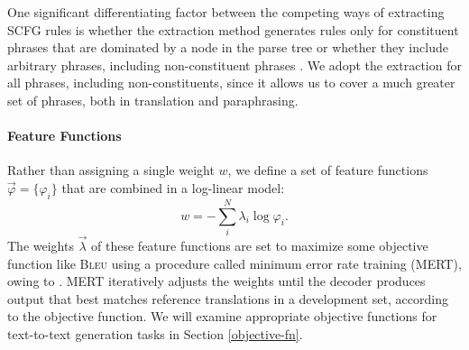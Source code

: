 \documentclass[11pt]{article}
\begin{document}
One significant differentiating factor between the competing ways of
extracting SCFG rules is whether the extraction method generates rules
only for constituent phrases that are dominated by a node in the parse
tree \cite{Galley2004,cohn-lapata:2008} or whether they include
arbitrary phrases, including non-constituent phrases
\cite{Zollmann2006,Callison-Burch2008}. We adopt the extraction for
all phrases, including non-constituents, since it allows us to cover a
much greater set of phrases, both in translation and paraphrasing.




\paragraph{Feature Functions}

Rather than assigning a single weight $w$, we define a set of feature
functions $\vec{\varphi} = \{\varphi_i\}$ that are combined in a
log-linear model:
\begin{equation}
  w = -\sum_i^N \lambda_i \log \varphi_i .
\end{equation}
The weights $\vec{\lambda}$ of these feature functions are set to
maximize some objective function like \textsc{Bleu}
\cite{Papineni2002} using a procedure called minimum error rate
training (MERT), owing to .  MERT iteratively
adjusts the weights until the decoder produces output that best
matches reference translations in a development set, according to the
objective function.  We will examine appropriate objective functions
for text-to-text generation tasks in Section \ref{objective-fn}.
\end{document}
